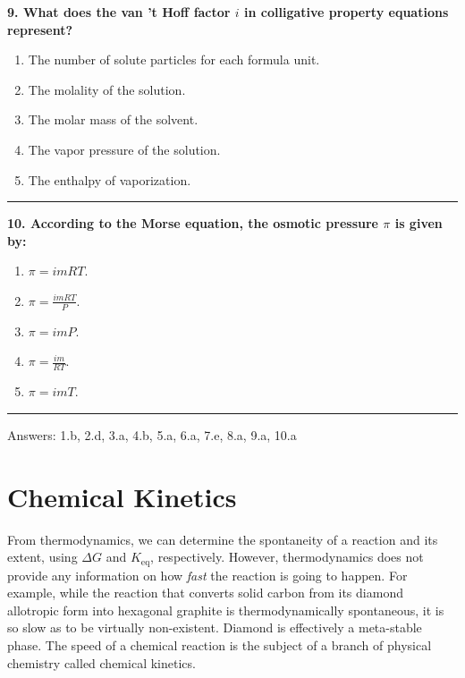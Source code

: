 \documentclass[
  9pt,
]{extbook}
\providecommand{\tightlist}{%
  \setlength{\itemsep}{0pt}\setlength{\parskip}{0pt}}
\theoremstyle{definition}
\theoremstyle{definition}
\theoremstyle{definition}
\theoremstyle{definition}
\theoremstyle{remark}
\begin{document}
\textbf{9. What does the van 't Hoff factor \(i\) in colligative property equations represent?}

\begin{enumerate}
\def\labelenumi{\alph{enumi}.}
\tightlist
\item
  The number of solute particles for each formula unit.
\item
  The molality of the solution.
\item
  The molar mass of the solvent.
\item
  The vapor pressure of the solution.
\item
  The enthalpy of vaporization.
\end{enumerate}

\begin{center}\rule{0.5\linewidth}{0.5pt}\end{center}

\textbf{10. According to the Morse equation, the osmotic pressure \(\pi\) is given by:}

\begin{enumerate}
\def\labelenumi{\alph{enumi}.}
\tightlist
\item
  \(\pi = imRT\).
\item
  \(\pi = \frac{imRT}{P}\).
\item
  \(\pi = imP\).
\item
  \(\pi = \frac{im}{RT}\).
\item
  \(\pi = imT\).
\end{enumerate}

\begin{center}\rule{0.5\linewidth}{0.5pt}\end{center}

Answers: 1.b, 2.d, 3.a, 4.b, 5.a, 6.a, 7.e, 8.a, 9.a, 10.a

\chapter{Chemical Kinetics}\label{Kinetics}

From thermodynamics, we can determine the spontaneity of a reaction and its extent, using \(\Delta G\) and \(K_{\text{eq}}\), respectively. However, thermodynamics does not provide any information on how \emph{fast} the reaction is going to happen. For example, while the reaction that converts solid carbon from its diamond allotropic form into hexagonal graphite is thermodynamically spontaneous, it is so slow as to be virtually non-existent. Diamond is effectively a meta-stable phase. The speed of a chemical reaction is the subject of a branch of physical chemistry called chemical kinetics.
\end{document}
